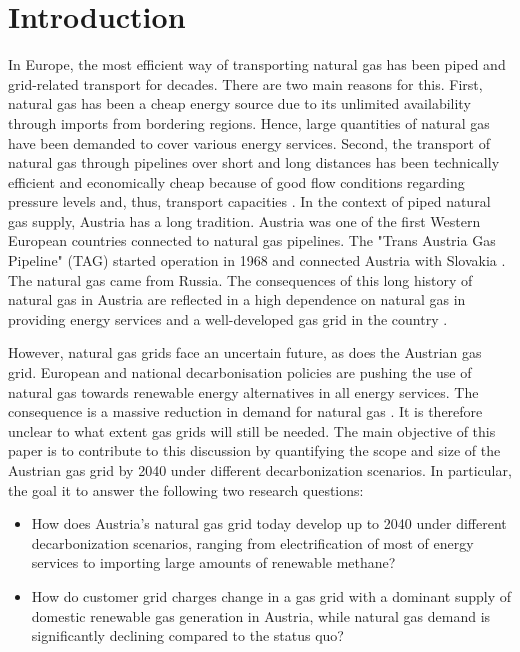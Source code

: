 \section{Introduction}

In Europe, the most efficient way of transporting natural gas has been piped and grid-related transport for decades. There are two main reasons for this. First, natural gas has been a cheap energy source due to its unlimited availability through imports from bordering regions. Hence, large quantities of natural gas have been demanded to cover various energy services. Second, the transport of natural gas through pipelines over short and long distances has been technically efficient and economically cheap because of good flow conditions regarding pressure levels and, thus, transport capacities \cite{thomas2003review}. In the context of piped natural gas supply, Austria has a long tradition. Austria was one of the first Western European countries connected to natural gas pipelines. The "Trans Austria Gas Pipeline" (TAG) started operation in 1968 and connected Austria with Slovakia \cite{gas_connect_austria}. The natural gas came from Russia. The consequences of this long history of natural gas in Austria are reflected in a high dependence on natural gas in providing energy services \cite{eurostat_natural_gas} and a well-developed gas grid in the country \cite{econtrol_grid}.\vspace{0.3cm}

However, natural gas grids face an uncertain future, as does the Austrian gas grid. European and national decarbonisation policies are pushing the use of natural gas towards renewable energy alternatives in all energy services. The consequence is a massive reduction in demand for natural gas \cite{repowereu}. It is therefore unclear to what extent gas grids will still be needed. The main objective of this paper is to contribute to this discussion by quantifying the scope and size of the Austrian gas grid by 2040 under different decarbonization scenarios. In particular, the goal it to answer the following two research questions:

\begin{itemize}
	\item How does Austria's natural gas grid today develop up to 2040 under different decarbonization scenarios, ranging from electrification of most of energy services to importing large amounts of renewable methane?
	\item How do customer grid charges change in a gas grid with a dominant supply of domestic renewable gas generation in Austria, while natural gas demand is significantly declining compared to the status quo?
\end{itemize}

